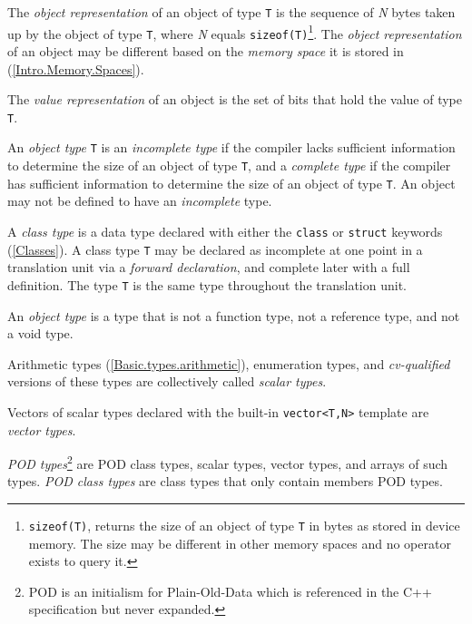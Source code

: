 

\p The \textit{object representation} of an object of type \texttt{T} is the
sequence of \textit{N} bytes taken up by the object of type \texttt{T}, where
\textit{N} equals \texttt{sizeof(T)}\footnote{\texttt{sizeof(T)}, returns the
size of an object of type \texttt{T} in bytes as stored in device memory.
The size may be different in other memory spaces and no operator exists to query
it.}. The \textit{object representation} of an object may be different based on
the \textit{memory space} it is stored in (\ref{Intro.Memory.Spaces}).

\p The \textit{value representation} of an object is the set of bits that hold
the value of type \texttt{T}.

\p An \textit{object type} \texttt{T} is an \textit{incomplete type} if the
compiler lacks sufficient information to determine the size of an object of type
\texttt{T}, and a \textit{complete type} if the compiler has sufficient
information to determine the size of an object of type \texttt{T}. An object may
not be defined to have an \textit{incomplete} type.

\p A \textit{class type} is a data type declared with either the \texttt{class}
or \texttt{struct} keywords (\ref{Classes}). A class type \texttt{T} may be
declared as incomplete at one point in a translation unit via a \textit{forward
declaration}, and complete later with a full definition. The type \texttt{T} is
the same type throughout the translation unit.

\p An \textit{object type} is a type that is not a function type, not a
reference type, and not a void type.

\p Arithmetic types (\ref{Basic.types.arithmetic}), enumeration types, and
\textit{cv-qualified} versions of these types are collectively called
\textit{scalar types}.

\p Vectors of scalar types declared with the built-in \texttt{vector<T,N>}
template are \textit{vector types}.

\p \textit{POD types}\footnote{POD is an initialism for Plain-Old-Data which is
referenced in the C++ specification but never expanded.} are POD class types,
scalar types, vector types, and arrays of such types. \textit{POD class types}
are class types that only contain members POD types.


